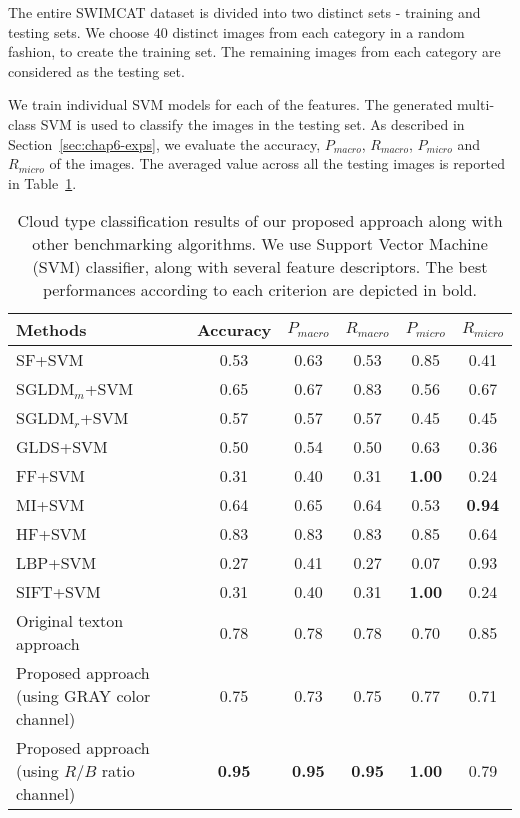 The entire SWIMCAT dataset is divided into two distinct sets - training and testing sets. We choose $40$ distinct images from each category in a random fashion, to create the training set. The remaining images from each category are considered as the testing set.

We train individual SVM models for each of the features. The generated multi-class SVM is used to classify the images in the testing set. As described in Section~\ref{sec:chap6-exps}, we evaluate the accuracy, $P_{macro}$, $R_{macro}$, $P_{micro}$ and $R_{micro}$ of the images. The averaged value across all the testing images is reported in Table~\ref{tab:class_results}. 

\begin{table}[htb]
\normalsize
\centering
\begin{tabular}{|p{6cm}|c|c|c|c|c|}
\hline
\textbf{Methods} & \textbf{Accuracy} & \textbf{$P_{macro}$}& \textbf{$R_{macro}$}& \textbf{$P_{micro}$}& \textbf{$R_{micro}$}\\
\hline 

SF+SVM & 0.53 & 0.63 & 0.53 & 0.85 & 0.41 \\

$\mbox{SGLDM}_{m}$+SVM & 0.65 & 0.67 & 0.83 & 0.56 & 0.67 \\

$\mbox{SGLDM}_{r}$+SVM & 0.57 & 0.57 & 0.57 & 0.45 & 0.45 \\

GLDS+SVM & 0.50 & 0.54 & 0.50 & 0.63 & 0.36 \\

FF+SVM & 0.31 & 0.40 & 0.31 & \textbf{1.00} & 0.24 \\

MI+SVM & 0.64 & 0.65 & 0.64 & 0.53 & \textbf{0.94} \\

HF+SVM & 0.83 & 0.83 & 0.83 & 0.85 & 0.64 \\

LBP+SVM & 0.27 & 0.41 & 0.27 & 0.07 & 0.93 \\

SIFT+SVM & 0.31 & 0.40 & 0.31 & \textbf{1.00} & 0.24 \\

Original texton approach & 0.78 & 0.78 & 0.78 & 0.70 & 0.85 \\

Proposed approach (using GRAY color channel) & 0.75 & 0.73 & 0.75 & 0.77 & 0.71 \\

Proposed approach (using $R/B$ ratio channel) & \textbf{0.95} & \textbf{0.95} & \textbf{0.95} & \textbf{1.00} & 0.79 \\
\hline
\end{tabular}
\caption[Benchmarking of various cloud classification algorithms.]{Cloud type classification results of our proposed approach along with other benchmarking algorithms. We use Support Vector Machine (SVM) classifier, along with several feature descriptors. The best performances according to each criterion are depicted in bold.}
\label{tab:class_results}
\end{table}

